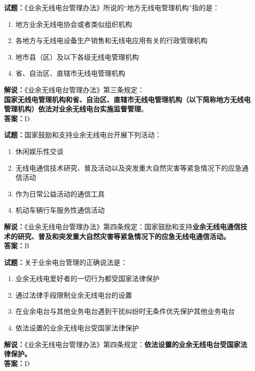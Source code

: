 \documentclass{ctexbook}
\begin{document}
\vspace{\baselineskip}

\noindent\textbf{试题：}《业余无线电台管理办法》所说的“地方无线电管理机构”指的是：
\begin{enumerate}[leftmargin=3em]
  \item 地方业余无线电协会或者类似组织机构
  \item 各地方与无线电设备生产销售和无线电应用有关的行政管理机构
  \item 地市县（区）及以下各级无线电管理机构
  \item 省、自治区、直辖市无线电管理机构
\end{enumerate}
\noindent\textbf{解说：}《业余无线电台管理办法》第三条规定：\\\textbf{国家无线电管理机构和省、自治区、直辖市无线电管理机构（以下简称地方无线电管理机构）依法对业余无线电台实施监督管理}。\\\noindent\textbf{答案：}D

\vspace{\baselineskip}

\noindent\textbf{试题：}国家鼓励和支持业余无线电台开展下列活动：
\begin{enumerate}[leftmargin=3em]
  \item 休闲娱乐性交谈
  \item 无线电通信技术研究、普及活动以及突发重大自然灾害等紧急情况下的应急通信活动
  \item 作为日常公益活动的通信工具
  \item 机动车辆行车服务性通信活动
\end{enumerate}
\noindent\textbf{解说：}《业余无线电台管理办法》第四条规定：国家鼓励和支持\textbf{业余无线电通信技术的研究、普及和突发重大自然灾害等紧急情况下的应急无线电通信活动。}\\\noindent\textbf{答案：}B

\vspace{\baselineskip}

\noindent\textbf{试题：}关于业余电台管理的正确说法是：
\begin{enumerate}[leftmargin=3em]
  \item 业余无线电爱好者的一切行为都受国家法律保护
  \item 通过法律手段限制业余无线电台的设置
  \item 在业余电台与其他业务电台遇到干扰纠纷时无条件优先保护其他业务电台
  \item 依法设置的业余无线电台受国家法律保护
\end{enumerate}
\noindent\textbf{解说：}《业余无线电台管理办法》第四条规定：\textbf{依法设置的业余无线电台受国家法律保护。}\\\noindent\textbf{答案：}D
\end{document}
